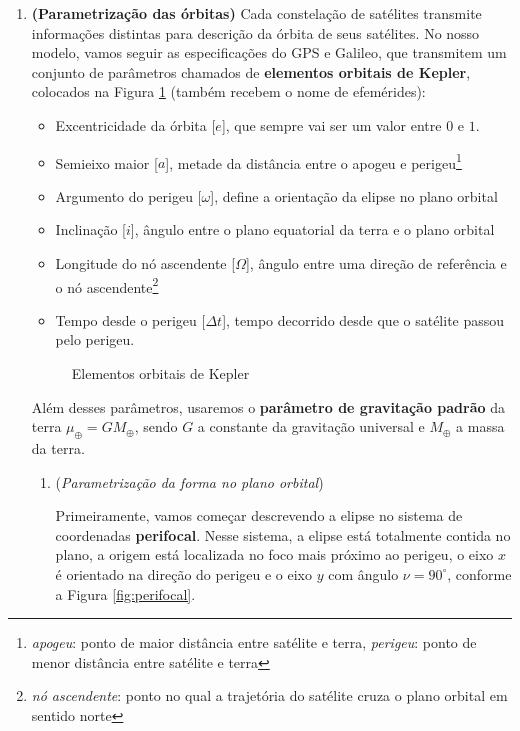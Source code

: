\documentclass[9pt]{article}
\begin{document}
\begin{enumerate}[label=$\blacktriangleright$ {\bf Exercício \arabic*},series=exerc,align=left]

\item {\bf (Parametrização das órbitas)} Cada constelação de satélites transmite informações distintas para descrição da órbita de seus satélites. No nosso modelo, vamos seguir as especificações do GPS e Galileo, que transmitem um conjunto de parâmetros chamados de \textbf{elementos orbitais de Kepler}, colocados na Figura \ref{fig:kep_orbit} (também recebem o nome de efemérides):
\begin{itemize}
    \item Excentricidade da órbita [$e$], que sempre vai ser um valor entre $0$ e $1$.
    \item Semieixo maior [$a$], metade da distância entre o apogeu e perigeu\footnote{\textit{apogeu}: ponto de maior distância entre satélite e terra, \textit{perigeu}: ponto de menor distância entre satélite e terra}
    \item Argumento do perigeu [$\omega$], define a orientação da elipse no plano orbital
    \item Inclinação [$i$], ângulo entre o plano equatorial da terra e o plano orbital
    \item Longitude do nó ascendente [$\Omega$], ângulo entre uma direção de referência e o nó ascendente\footnote{\textit{nó ascendente}: ponto no qual a trajetória do satélite cruza o plano orbital em sentido norte}
    \item Tempo desde o perigeu [$\Delta t$], tempo decorrido desde que o satélite passou pelo perigeu.
\end{itemize}

\begin{figure}[H]
    \centering
    
    \caption{Elementos orbitais de Kepler}
    \label{fig:kep_orbit}
\end{figure}

Além desses parâmetros, usaremos o \textbf{parâmetro de gravitação padrão} da terra $\mu_\oplus = GM_\oplus$, sendo $G$ a constante da gravitação universal e $M_\oplus$ a massa da terra.

\begin{enumerate}[label=(\alph*)]
    \item (\textit{Parametrização da forma no plano orbital}) 
    
    Primeiramente, vamos começar descrevendo a elipse no sistema de coordenadas \textbf{perifocal}. Nesse sistema, a elipse está totalmente contida no plano, a origem está localizada no foco mais próximo ao perigeu, o eixo $x$ é orientado na direção do perigeu e o eixo $y$ com ângulo $\nu=90^\circ$, conforme a Figura \ref{fig:perifocal}.


\end{enumerate}
\end{enumerate}
\end{document}
